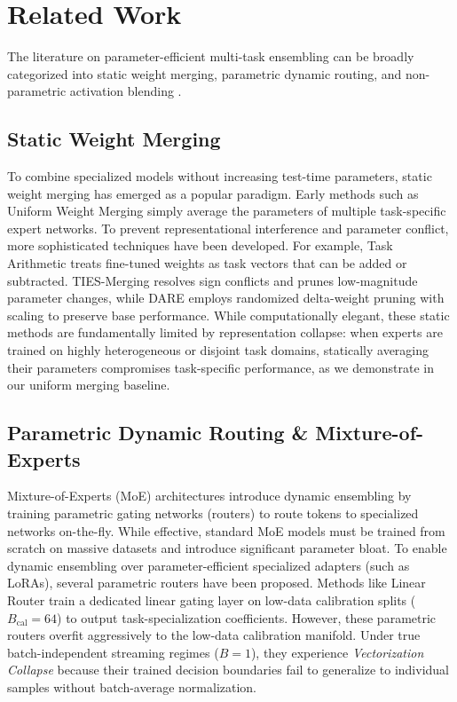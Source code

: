 \section{Related Work}
\label{sec:related_work}

The literature on parameter-efficient multi-task ensembling can be broadly categorized into static weight merging, parametric dynamic routing, and non-parametric activation blending \cite{yang2024modelmerging}.

\subsection{Static Weight Merging}
To combine specialized models without increasing test-time parameters, static weight merging has emerged as a popular paradigm. Early methods such as Uniform Weight Merging \cite{wortsman2022modelmerging} simply average the parameters of multiple task-specific expert networks. To prevent representational interference and parameter conflict, more sophisticated techniques have been developed. For example, Task Arithmetic \cite{ilharco2022taskarithmetic} treats fine-tuned weights as task vectors that can be added or subtracted. TIES-Merging \cite{yadav2023ties} resolves sign conflicts and prunes low-magnitude parameter changes, while DARE \cite{yu2023dare} employs randomized delta-weight pruning with scaling to preserve base performance. While computationally elegant, these static methods are fundamentally limited by representation collapse: when experts are trained on highly heterogeneous or disjoint task domains, statically averaging their parameters compromises task-specific performance, as we demonstrate in our uniform merging baseline.

\subsection{Parametric Dynamic Routing \& Mixture-of-Experts}
Mixture-of-Experts (MoE) architectures \cite{shazeer2017moe, fedus2022switch} introduce dynamic ensembling by training parametric gating networks (routers) to route tokens to specialized networks on-the-fly. While effective, standard MoE models must be trained from scratch on massive datasets and introduce significant parameter bloat. 
To enable dynamic ensembling over parameter-efficient specialized adapters (such as LoRAs), several parametric routers have been proposed. Methods like Linear Router \cite{pfsr2024} train a dedicated linear gating layer on low-data calibration splits ($B_{\text{cal}} = 64$) to output task-specialization coefficients. However, these parametric routers overfit aggressively to the low-data calibration manifold. Under true batch-independent streaming regimes ($B=1$), they experience \emph{Vectorization Collapse} because their trained decision boundaries fail to generalize to individual samples without batch-average normalization.

